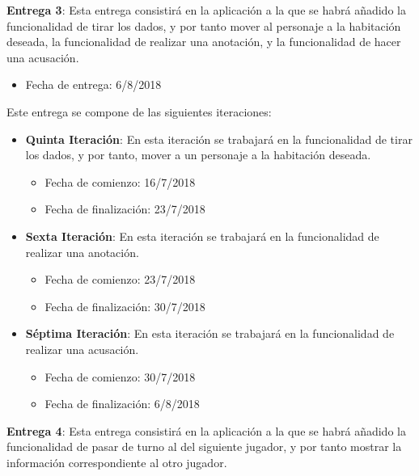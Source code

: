 \hfill

\textbf{Entrega 3}: Esta entrega consistirá en la aplicación a la que se habrá añadido la funcionalidad de tirar los dados, y por tanto mover al personaje a la habitación deseada, la funcionalidad de realizar una anotación, y la funcionalidad de hacer una acusación.

\begin{itemize}
  \item Fecha de entrega: 6/8/2018
\end{itemize}

\hfill

Este entrega se compone de las siguientes iteraciones:

\begin{itemize}
  \item \textbf{Quinta Iteración}: En esta iteración se trabajará en la funcionalidad de tirar los dados, y por tanto, mover a un personaje a la habitación deseada.

  \begin{itemize}
    \item Fecha de comienzo: 16/7/2018
    \item Fecha de finalización: 23/7/2018
  \end{itemize}

  \item \textbf{Sexta Iteración}: En esta iteración se trabajará en la funcionalidad de realizar una anotación.

  \begin{itemize}
    \item Fecha de comienzo: 23/7/2018
    \item Fecha de finalización: 30/7/2018
  \end{itemize}

  \item \textbf{Séptima Iteración}: En esta iteración se trabajará en la funcionalidad de realizar una acusación.

  \begin{itemize}
    \item Fecha de comienzo: 30/7/2018
    \item Fecha de finalización: 6/8/2018
  \end{itemize}
\end{itemize}

\hfill

\textbf{Entrega 4}: Esta entrega consistirá en la aplicación a la que se habrá añadido la funcionalidad de pasar de turno al del siguiente jugador, y por tanto mostrar la información correspondiente al otro jugador.

